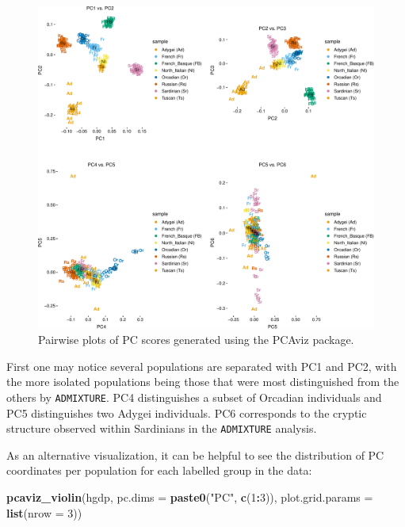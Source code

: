 \documentclass[smallextended]{svmult}       %
\newenvironment{Shaded}{\begin{snugshade}}{\end{snugshade}}
\newcommand{\KeywordTok}[1]{\textcolor[rgb]{0.13,0.29,0.53}{\textbf{#1}}}
\newcommand{\DataTypeTok}[1]{\textcolor[rgb]{0.13,0.29,0.53}{#1}}
\newcommand{\DecValTok}[1]{\textcolor[rgb]{0.00,0.00,0.81}{#1}}
\newcommand{\StringTok}[1]{\textcolor[rgb]{0.31,0.60,0.02}{#1}}
\newcommand{\OperatorTok}[1]{\textcolor[rgb]{0.81,0.36,0.00}{\textbf{#1}}}
\newcommand{\NormalTok}[1]{#1}
\begin{document}
\begin{figure}
\includegraphics[width=1\linewidth]{plot/unnamed-chunk-20-1} \caption{Pairwise plots of PC scores generated using the PCAviz package.}\label{fig:unnamed-chunk-20}
\end{figure}

First one may notice several populations are separated with PC1 and PC2,
with the more isolated populations being those that were most
distinguished from the others by \texttt{ADMIXTURE}. PC4 distinguishes a
subset of Orcadian individuals and PC5 distinguishes two Adygei
individuals. PC6 corresponds to the cryptic structure observed within
Sardinians in the \texttt{ADMIXTURE} analysis.

As an alternative visualization, it can be helpful to see the
distribution of PC coordinates per population for each labelled group in
the data:

\begin{Shaded}
\begin{Highlighting}[]
\KeywordTok{pcaviz_violin}\NormalTok{(hgdp, }\DataTypeTok{pc.dims =} \KeywordTok{paste0}\NormalTok{(}\StringTok{"PC"}\NormalTok{, }\KeywordTok{c}\NormalTok{(}\DecValTok{1}\OperatorTok{:}\DecValTok{3}\NormalTok{)), }
              \DataTypeTok{plot.grid.params =} \KeywordTok{list}\NormalTok{(}\DataTypeTok{nrow =} \DecValTok{3}\NormalTok{))}
\end{Highlighting}
\end{Shaded}
\end{document}
